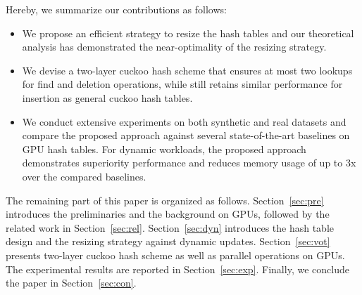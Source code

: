 
Hereby, we summarize our contributions as follows:
\begin{itemize}
	\item We propose an efficient strategy to resize the hash tables and our theoretical analysis has demonstrated the near-optimality of the resizing strategy.
	\item We devise a two-layer cuckoo hash scheme that ensures at most two lookups for find and deletion operations, while still retains similar performance for insertion as general cuckoo hash tables. 
	\item We conduct extensive experiments on both synthetic and real datasets and compare the proposed approach against several state-of-the-art baselines on GPU hash tables. For dynamic workloads, the proposed approach demonstrates superiority performance and reduces memory usage of up to 3x over the compared baselines.
\end{itemize}

The remaining part of this paper is organized as follows. Section~\ref{sec:pre} introduces the preliminaries and the background on GPUs, followed by the related work in Section~\ref{sec:rel}. Section~\ref{sec:dyn} introduces the hash table design and the resizing strategy against dynamic updates.
Section~\ref{sec:vot} presents two-layer cuckoo hash scheme as well as parallel operations on GPUs. The experimental results are reported in Section~\ref{sec:exp}. Finally, we conclude the paper in Section~\ref{sec:con}.